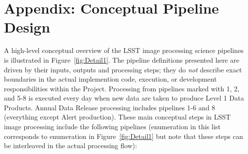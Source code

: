 \documentclass[12pt]{article}
\begin{document}



\clearpage
\section{\bf Appendix: Conceptual Pipeline Design \label{sec:scipi}}

A high-level conceptual overview of the LSST image processing science pipelines is illustrated
in Figure~\ref{fig:Detail1}. The pipeline definitions presented here are driven by their inputs,
outputs and processing steps; they do {\it not} describe exact boundaries in the actual implemention
code, execution, or development responsibilities within the Project.
Processing from pipelines marked with 1, 2, and 5-8 is executed every day when new data are taken
to produce Level 1 Data Products. Annual Data Release processing includes pipelines 1-6 and 8
(everything except Alert production). These main conceptual steps in LSST image processing
include the following pipelines (enumeration in this list corresponds to enumeration in Figure~\ref{fig:Detail1}
but note that these steps can be interleaved in the actual processing flow):
\end{document}
